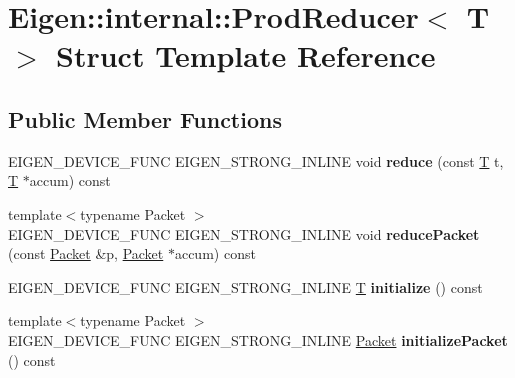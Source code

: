 \hypertarget{struct_eigen_1_1internal_1_1_prod_reducer}{}\section{Eigen\+:\+:internal\+:\+:Prod\+Reducer$<$ T $>$ Struct Template Reference}
\label{struct_eigen_1_1internal_1_1_prod_reducer}
\subsection*{Public Member Functions}
\begin{DoxyCompactItemize}
\item 
\mbox{\label{struct_eigen_1_1internal_1_1_prod_reducer_aa24c0a12f0cb8ec2c12a978e63c65b27}} 
E\+I\+G\+E\+N\+\_\+\+D\+E\+V\+I\+C\+E\+\_\+\+F\+U\+NC E\+I\+G\+E\+N\+\_\+\+S\+T\+R\+O\+N\+G\+\_\+\+I\+N\+L\+I\+NE void {\bfseries reduce} (const \hyperlink{group___sparse_core___module}{T} t, \hyperlink{group___sparse_core___module}{T} $\ast$accum) const
\item 
\mbox{\label{struct_eigen_1_1internal_1_1_prod_reducer_a93136dafe31ae00c5a9de5150e8f2f66}} 
{\footnotesize template$<$typename Packet $>$ }\\E\+I\+G\+E\+N\+\_\+\+D\+E\+V\+I\+C\+E\+\_\+\+F\+U\+NC E\+I\+G\+E\+N\+\_\+\+S\+T\+R\+O\+N\+G\+\_\+\+I\+N\+L\+I\+NE void {\bfseries reduce\+Packet} (const \hyperlink{union_eigen_1_1internal_1_1_packet}{Packet} \&p, \hyperlink{union_eigen_1_1internal_1_1_packet}{Packet} $\ast$accum) const
\item 
\mbox{\label{struct_eigen_1_1internal_1_1_prod_reducer_a6609e47e6b26429236c89d3f33e0fb0c}} 
E\+I\+G\+E\+N\+\_\+\+D\+E\+V\+I\+C\+E\+\_\+\+F\+U\+NC E\+I\+G\+E\+N\+\_\+\+S\+T\+R\+O\+N\+G\+\_\+\+I\+N\+L\+I\+NE \hyperlink{group___sparse_core___module}{T} {\bfseries initialize} () const
\item 
\mbox{\label{struct_eigen_1_1internal_1_1_prod_reducer_ad211cbb6d1f2a98e554134b84dbd7ca8}} 
{\footnotesize template$<$typename Packet $>$ }\\E\+I\+G\+E\+N\+\_\+\+D\+E\+V\+I\+C\+E\+\_\+\+F\+U\+NC E\+I\+G\+E\+N\+\_\+\+S\+T\+R\+O\+N\+G\+\_\+\+I\+N\+L\+I\+NE \hyperlink{union_eigen_1_1internal_1_1_packet}{Packet} {\bfseries initialize\+Packet} () const

\end{DoxyCompactItemize}
